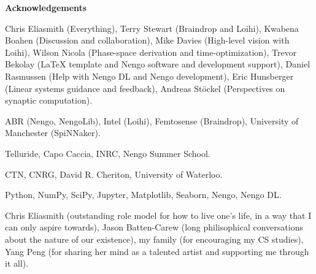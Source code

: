 {}
\begin{center}\textbf{Acknowledgements}\end{center}

Chris Eliasmith (Everything),
Terry Stewart (Braindrop and Loihi),
Kwabena Boahen (Discussion and collaboration),
Mike Davies (High-level vision with Loihi),
Wilson Nicola (Phase-space derivation and time-optimization),
Trevor Bekolay (\LaTeX{} template and Nengo software and development support),
Daniel Rasmussen (Help with Nengo DL and Nengo development),
Eric Hunsberger (Linear systems guidance and feedback),
Andreas St\"ockel (Perspectives on synaptic computation).

ABR (Nengo, NengoLib), Intel (Loihi), Femtosense (Braindrop), University of Manchester (SpiNNaker).

Telluride, Capo Caccia, INRC, Nengo Summer School.

CTN, CNRG, David R. Cheriton, University of Waterloo.

Python, NumPy, SciPy, Jupyter, Matplotlib, Seaborn, Nengo, Nengo DL.

Chris Eliasmith (outstanding role model for how to live one's life, in a way that I can only aspire towards),
Jason Batten-Carew (long philisophical conversations about the nature of our existence),
my family (for encouraging my CS studies),
Yang Peng (for sharing her mind as a talented artist and supporting me through it all).

\cleardoublepage
